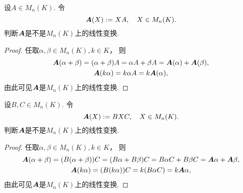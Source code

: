 \begin{example}
设\(A \in M_n(K)\).
令\[
	\boldsymbol{A}(X) := X A,
	\quad X \in M_n(K).
\]
判断\(\boldsymbol{A}\)是不是\(M_n(K)\)上的线性变换.
\begin{proof}
任取\(\alpha,\beta \in M_n(K),
k \in K\)，
则\begin{gather*}
	\boldsymbol{A}(\alpha + \beta)
	= (\alpha + \beta) A
	= \alpha A + \beta A
	= \boldsymbol{A}(\alpha) + \boldsymbol{A}(\beta), \\
	\boldsymbol{A}(k \alpha)
	= k \alpha A
	= k \boldsymbol{A}(\alpha),
\end{gather*}
由此可见\(\boldsymbol{A}\)是\(M_n(K)\)上的线性变换.
\end{proof}
\end{example}

\begin{example}
设\(B,C \in M_n(K)\).
令\[
	\boldsymbol{A}(X) := B X C,
	\quad X \in M_n(K).
\]
判断\(\boldsymbol{A}\)是不是\(M_n(K)\)上的线性变换.
\begin{proof}
任取\(\alpha,\beta \in M_n(K),
k \in K\)，
则\begin{gather*}
	\boldsymbol{A}(\alpha+\beta)
	= (B(\alpha+\beta))C
	= (B\alpha+B\beta)C
	= B \alpha C + B \beta C
	= \boldsymbol{A}\alpha + \boldsymbol{A}\beta, \\
	\boldsymbol{A}(k \alpha)
	= (B(k\alpha))C
	= k (B \alpha C)
	= k \boldsymbol{A}\alpha,
\end{gather*}
由此可见\(\boldsymbol{A}\)是\(M_n(K)\)上的线性变换.
\end{proof}
\end{example}

